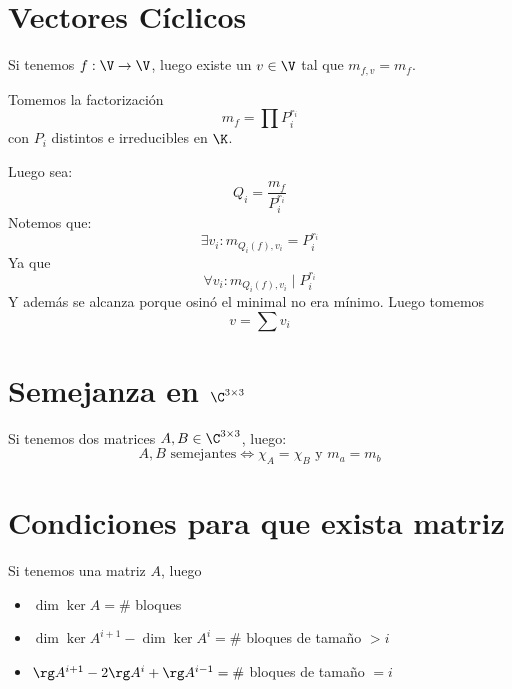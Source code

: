 \documentclass{article}
\begin{document}
\section*{Vectores Cíclicos}
Si tenemos $f : \V \to \V$, luego existe un $v \in \V$ tal que $m_{f,v} = m_f$.

Tomemos la factorización
\[m_f = \prod P_i^{r_i}\]
con $P_i$ distintos e irreducibles en $\K$.

Luego sea:
\[Q_i = \frac{m_f}{P_i^{r_i}}\]
Notemos que:
\[
	\exists v_i : m_{Q_i(f), v_i} = P_i^{r_i}
\]
Ya que
\[
	\forall v_i : m_{Q_i(f), v_i} \mid P_i^{r_i}
\]
Y además se alcanza porque osinó el minimal no era mínimo.
Luego tomemos
\[v = \sum v_i\]

\section*{Semejanza en $\C^{3 \times 3}$}
Si tenemos dos matrices $A, B \in \C^{3 \times 3}$, luego:
\[
	A,B \text{ semejantes} \iff \chi_A = \chi_B \text{ y } m_a = m_b
\]

\section*{Condiciones para que exista matriz}
Si tenemos una matriz $A$, luego
\begin{itemize}
	\item $\dim \ker A = \#$ bloques
	\item $\dim \ker A^{i+1} - \dim \ker A^i = \#$ bloques de tamaño $> i$
	\item $\rg A^{i+1} - 2\rg A^i + \rg A^{i-1} = \#$ bloques de tamaño $= i$
\end{itemize}
\end{document}
